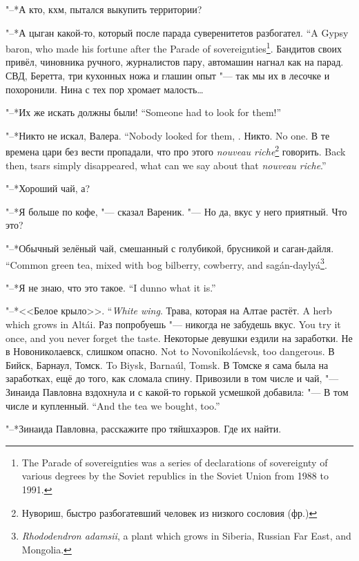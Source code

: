 "--*А кто, кхм, пытался выкупить территории?

{"--*А цыган какой-то, который после парада суверенитетов разбогател.}
{``A Gypsy baron, who made his fortune after the Parade of sovereignties\footnote{The Parade of sovereignties was a series of declarations of sovereignty of various degrees by the Soviet republics in the Soviet Union from 1988 to 1991.}.}
Бандитов своих привёл, чиновника ручного, журналистов пару, автомашин нагнал как на парад.
СВД, Беретта, три кухонных ножа и глашин опыт "--- так мы их в лесочке и похоронили.
Нина с тех пор хромает малость\dots{}

{"--*Их же искать должны были!}
{``Someone had to look for them!''}

{"--*Никто не искал, Валера.}
{``Nobody looked for them, \Valera.}
{Никто.}
{No one.}
{В те времена цари без вести пропадали, что про этого \textit{nouveau riche}\footnote{Нувориш, быстро разбогатевший человек из низкого сословия (фр.)} говорить.}
{Back then, tsars simply disappeared, what can we say about that \textit{nouveau riche}.''}

\asterism

"--*Хороший чай, а?

"--*Я больше по кофе, "--- сказал Вареник.
"--- Но да, вкус у него приятный.
Что это?

{"--*Обычный зелёный чай, смешанный с голубикой, брусникой и саган-дайля.}
{``Common green tea, mixed with bog bilberry, cowberry, and sag\'an-dayly\'a\footnote{\textit{Rhododendron adamsii}, a plant which grows in Siberia, Russian Far East, and Mongolia.}.}

{"--*Я не знаю, что это такое.}
{``I dunno what it is.''}

{"--*<<Белое крыло>>.}
{``\emph{White wing}.}
{Трава, которая на Алтае растёт.}
{A herb which grows in Alt\'ai.}
{Раз попробуешь "--- никогда не забудешь вкус.}
{You try it once, and you never forget the taste.}
Некоторые девушки ездили на заработки.
{Не в Новониколаевск, слишком опасно.}
{Not to Novonikol\'aevsk, too dangerous.}
{В Бийск, Барнаул, Томск.}
{To Biysk, Barna\'ul, Tomsk.}
В Томске я сама была на заработках, ещё до того, как сломала спину.
Привозили в том числе и чай, "--- Зинаида Павловна вздохнула и с какой-то горькой усмешкой добавила:
{"--- В том числе и купленный.}
{``And the tea we bought, too.''}

"--*Зинаида Павловна, расскажите про тяйшхаэров.
Где их найти.

